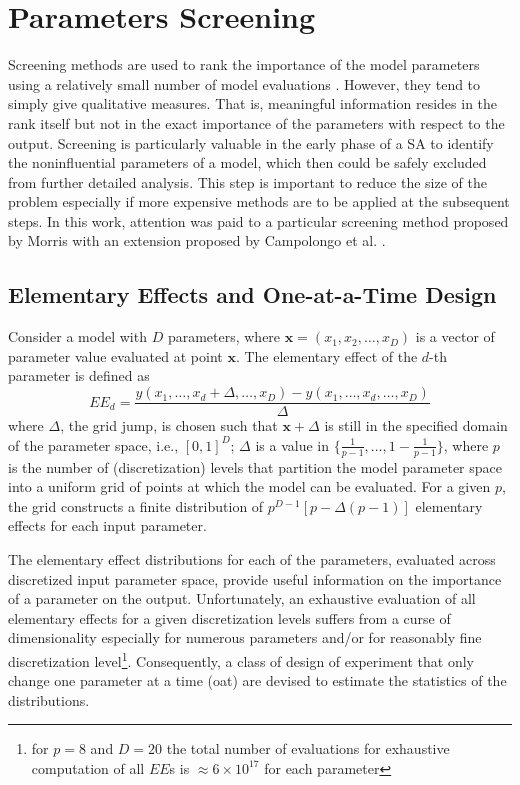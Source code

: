 \section{Parameters Screening}\label{sec:sa_parameters_screening}

Screening methods are used to rank the importance of the model parameters using a relatively small number of model evaluations \cite{Saltelli2004}.
However, they tend to simply give qualitative measures.
That is, meaningful information resides in the rank itself but not in the exact importance of the parameters with respect to the output. 
Screening is particularly valuable in the early phase of a SA to identify the noninfluential parameters of a model,
which then could be safely excluded from further detailed analysis. 
This step is important to reduce the size of the problem especially if more expensive methods are to be applied at the subsequent steps. 
In this work, attention was paid to a particular screening method proposed by Morris \cite{Morris1991} with an extension proposed by Campolongo et al. \cite{Campolongo2011}.

\subsection{Elementary Effects and One-at-a-Time Design}\label{sub:sa_ee_oat}

Consider a model with $D$ parameters, where $\mathbf{x} = (x_1, x_2, \dots,x_D)$ is a vector of parameter value evaluated at point $\mathbf{x}$.
The elementary effect of the $d$-th parameter is defined as
\begin{equation}
EE_d = \frac{y(x_1, \dots, x_d+\Delta,\dots,x_D) - y(x_1, \dots, x_d,\dots,x_D)}{\Delta}
\end{equation}
where $\Delta$, the grid jump, is chosen such that $\mathbf{x} + \Delta$ is still in the specified domain of the parameter space, i.e., $[0,1]^D$; 
$\Delta$ is a value in $\{\frac{1}{p-1}, \dots, 1 - \frac{1}{p-1}\}$, 
where $p$ is the number of (discretization) levels that partition the model parameter space into a uniform grid of points at which the model can be evaluated. 
For a given $p$, the grid constructs a finite distribution of $p^{D-1}[p - \Delta(p-1)]$ elementary effects for each input parameter.

The elementary effect distributions for each of the parameters, evaluated across discretized input parameter space, 
provide useful information on the importance of a parameter on the output.
Unfortunately, an exhaustive evaluation of all elementary effects for a given discretization levels suffers from a curse of dimensionality especially for numerous parameters and/or for reasonably fine discretization level\footnote{for $p = 8$ and $D = 20$ the total number of evaluations for exhaustive computation of all $EE$s is $\approx 6 \times 10^{17}$ for each parameter}.
Consequently, a class of design of experiment that only change one parameter at a time (\gls{oat}) are devised to estimate the statistics of the distributions.
  
